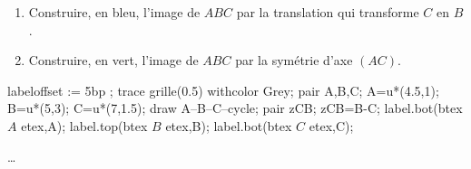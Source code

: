 \begin{exercice*}
    \begin{enumerate}
        \item Construire, en bleu, l'image de $ABC$ par la translation qui transforme $C$ en $B$.
        \item Construire, en vert, l'image de $ABC$ par la symétrie d'axe $(AC)$.
    \end{enumerate}
    \medskip
    \begin{Geometrie}[CoinHD={(8u,7u)}]
        labeloffset := 5bp ;
        trace grille(0.5) withcolor Grey;
        pair A,B,C;
        A=u*(4.5,1);
        B=u*(5,3);
        C=u*(7,1.5);
        draw A--B--C--cycle;
        pair zCB;
        zCB=B-C;
        label.bot(btex $A$ etex,A);                
        label.top(btex $B$ etex,B);
        label.bot(btex $C$ etex,C);
    \end{Geometrie}
\end{exercice*}
\begin{corrige}
\dots
\end{corrige}

